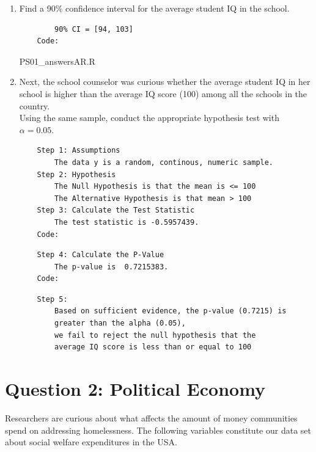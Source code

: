 \documentclass[12pt,letterpaper]{article}
\begin{document}
\begin{enumerate}
	\item Find a 90\% confidence interval for the average student IQ in the school.\\
	
	\begin{Verbatim}
		90% CI = [94, 103]
	Code: 
	\end{Verbatim}
			 {PS01_answersAR.R}  
	\vspace{4cm}
	\item Next, the school counselor was curious  whether  the average student IQ in her school is higher than the average IQ score (100) among all the schools in the country.\\ 
	\noindent Using the same sample, conduct the appropriate hypothesis test with $\alpha=0.05$.
	\begin{Verbatim}
	Step 1: Assumptions
		The data y is a random, continous, numeric sample.
	Step 2: Hypothesis
		The Null Hypothesis is that the mean is <= 100
		The Alternative Hypothesis is that mean > 100
	Step 3: Calculate the Test Statistic
		The test statistic is -0.5957439.
	Code:
		\end{Verbatim}
		  
	\begin{Verbatim}
	Step 4: Calculate the P-Value
		The p-value is  0.7215383.
	Code:
	\end{Verbatim}
		
	\begin{Verbatim}
	Step 5:
		Based on sufficient evidence, the p-value (0.7215) is 
		greater than the alpha (0.05),
		we fail to reject the null hypothesis that the 
		average IQ score is less than or equal to 100
	\end{Verbatim}
\end{enumerate}

\newpage

	\section*{Question 2: Political Economy}

\noindent Researchers are curious about what affects the amount of money communities spend on addressing homelessness. The following variables constitute our data set about social welfare expenditures in the USA. \\
\vspace{.5cm}
\end{document}
